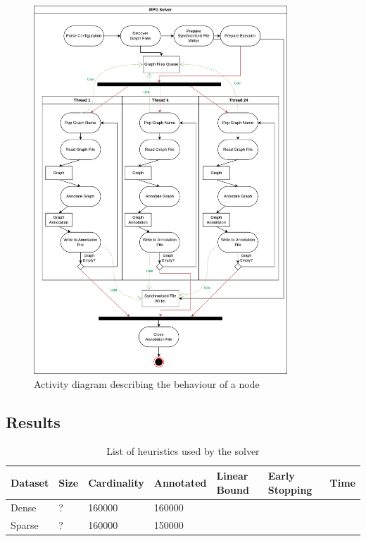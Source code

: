 \begin{figure}[H]
	\centering
	\includegraphics[width=0.85\textwidth]{Figures/AnnotationThreads.png}
	\caption{Activity diagram describing the behaviour of a node
		\label{fig:HPCAnnotationProcess}}
\end{figure}
\FloatBarrier
\newpage
\subsection{Results}
\begin{table}[h]
	\small
	\begin{tabularx}{\textwidth}{| p{1.5cm} | p{1.2cm} | p{2cm} | p{2cm} | X | X | X |}
		\hline
		
		Dataset & Size & Cardinality & Annotated & Linear Bound & Early Stopping & Time  \\
		\hline
		Dense & ? & 160000 & 160000 &\cmark &  \cmark & \\	
		\hline
		Sparse & ? & 160000& 150000  & \cmark &  \xmark & \\	
		\hline
	\end{tabularx}
	\caption{List of heuristics used by the solver
		\label{table:SolverResults}}
\end{table}
\FloatBarrier
